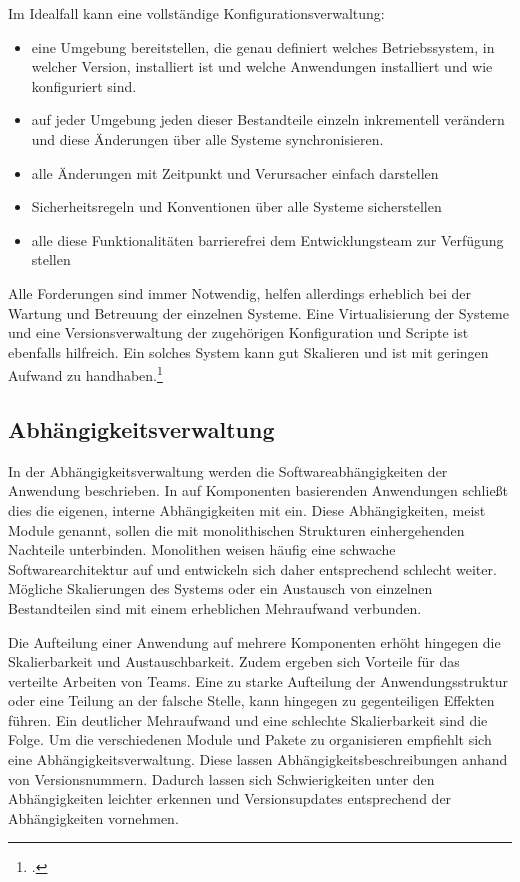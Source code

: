 Im Idealfall kann eine vollständige Konfigurationsverwaltung:
\begin{itemize}
\item eine Umgebung bereitstellen, die genau definiert welches Betriebssystem, in welcher Version, installiert ist und welche Anwendungen installiert und wie konfiguriert sind.
\item auf jeder Umgebung jeden dieser Bestandteile einzeln inkrementell verändern und diese Änderungen über alle Systeme synchronisieren.
\item alle Änderungen mit Zeitpunkt und Verursacher einfach darstellen
\item Sicherheitsregeln und Konventionen über alle Systeme sicherstellen
\item alle diese Funktionalitäten barrierefrei dem Entwicklungsteam zur Verfügung stellen
\end{itemize}

Alle Forderungen sind immer Notwendig, helfen allerdings erheblich bei der Wartung und Betreuung der einzelnen Systeme. 
Eine Virtualisierung der Systeme und eine Versionsverwaltung der zugehörigen Konfiguration und Scripte ist ebenfalls 
hilfreich. Ein solches System kann gut Skalieren und ist mit geringen Aufwand zu handhaben.\footcite{humble2010}

\subsection{Abhängigkeitsverwaltung}

In der Abhängigkeitsverwaltung werden die Softwareabhängigkeiten der Anwendung beschrieben. In auf  Komponenten 
basierenden Anwendungen schließt dies die eigenen, interne Abhängigkeiten mit ein. Diese Abhängigkeiten, meist Module 
genannt, sollen die mit monolithischen Strukturen einhergehenden Nachteile unterbinden. Monolithen weisen häufig eine 
schwache Softwarearchitektur auf und entwickeln sich daher entsprechend schlecht weiter. Mögliche Skalierungen des 
Systems oder ein Austausch von einzelnen Bestandteilen sind mit einem erheblichen Mehraufwand verbunden.

Die Aufteilung einer Anwendung auf mehrere Komponenten erhöht hingegen die Skalierbarkeit und Austauschbarkeit. Zudem 
ergeben sich Vorteile für das verteilte Arbeiten von Teams. 
Eine zu starke Aufteilung der Anwendungsstruktur oder eine Teilung an der falsche Stelle, kann hingegen zu gegenteiligen 
Effekten führen. Ein deutlicher Mehraufwand und eine schlechte Skalierbarkeit sind die Folge. Um die verschiedenen Module 
und Pakete zu organisieren empfiehlt sich eine Abhängigkeitsverwaltung. Diese lassen Abhängigkeitsbeschreibungen anhand 
von Versionsnummern. Dadurch lassen sich Schwierigkeiten unter den Abhängigkeiten leichter erkennen und Versionsupdates 
entsprechend der Abhängigkeiten vornehmen.


